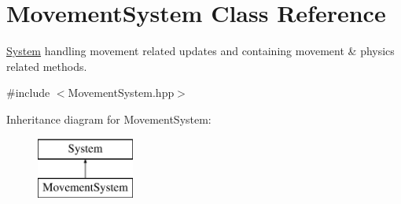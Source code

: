\hypertarget{class_movement_system}{}\section{Movement\+System Class Reference}
\label{class_movement_system}


\hyperlink{class_system}{System} handling movement related updates and containing movement \& physics related methods.  




{\ttfamily \#include $<$Movement\+System.\+hpp$>$}

Inheritance diagram for Movement\+System\+:\begin{figure}[H]
\begin{center}
\leavevmode
\includegraphics[height=2.000000cm]{class_movement_system}
\end{center}
\end{figure}
